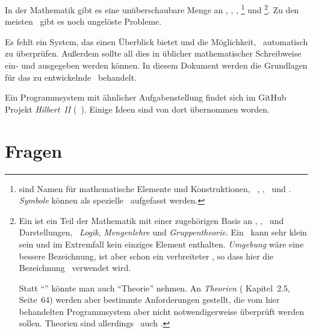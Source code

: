 In der Mathematik gibt es eine unüberschaubare Menge an \Axiomen, \Saetzen, \Beweisen, \emph{\Fachbegriffen}%
\footnote{%
	 sind Namen für mathematische Elemente und Konstruktionen, \textzB\ \Axiomen, \Saetze, \Beweise\ und \Fachgebiete.
	\emph{Symbole} können als spezielle \Fachbegriffe\ aufgefasst werden.
}
und \emph{\Fachgebieten}%
\footnote{%
	Ein  ist ein Teil der Mathematik mit einer zugehörigen Basis an \Axiomen, \Saetzen, \Fachbegriffen\ und Darstellungen, \textzB\ \emph{Logik}, \emph{Mengenlehre} und \emph{Gruppentheorie}.
	Ein \Fachgebiet\ kann sehr klein sein und im Extremfall kein einziges Element enthalten.
	\emph{Umgebung} wäre eine bessere Bezeichnung, ist aber schon ein verbreiteter \Fachbegriff, so dass hier die Bezeichnung \Fachgebiet\ verwendet wird.

	Statt \enquote{\Fachgebiet} könnte man auch \enquote{Theorie} nehmen.
	An \emph{Theorien} ( Kapitel~2.5, Seite~64) werden aber bestimmte Anforderungen gestellt, die vom hier behandelten Programmsystem aber nicht notwendigerweise überprüft werden sollen.
	Theorien sind allerdings \textiAlg\ auch \Fachgebiete.
}.
Zu den meisten \Fachgebieten\ gibt es noch ungelöste Probleme.

Es fehlt ein System, das einen Überblick bietet und die Möglichkeit, \Beweise\ automatisch zu überprüfen.
Außerdem sollte all dies in üblicher mathematischer Schreibweise ein- und ausgegeben werden können.
In diesem Dokument werden die Grundlagen für das zu entwickelnde \ASBA\ behandelt.

Ein Programmsystem mit ähnlicher Aufgabenstellung findet sich im GitHub Projekt \emph{Hilbert~II} (\seename~\cite{bib:HilbertII, bib:qedeq}).
Einige Ideen sind von dort übernommen worden.

\section{Fragen}%
\label{sec-Fragen}

